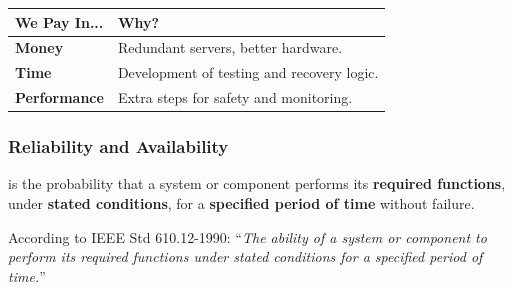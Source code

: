 \begin{table}[!htp]
    \centering
    \begin{tabular}{@{} l l @{}}
        \toprule
        We Pay In... & Why? \\
        \midrule
        \textbf{Money}          & Redundant servers, better hardware. \\ [.3em]
        \textbf{Time}           & Development of testing and recovery logic. \\ [.3em]
        \textbf{Performance}    & Extra steps for safety and monitoring. \\
        \bottomrule
    \end{tabular}
\end{table}

\newpage

\subsubsection{Reliability and Availability}

\highspace
\begin{definitionbox}[: Reliability]
     is the probability that a system or component performs its \textbf{required functions}, under \textbf{stated conditions}, for a \textbf{specified period of time} without failure.

    \highspace
    According to IEEE Std 610.12-1990: ``\emph{The ability of a system or component to perform its required functions under stated conditions for a specified period of time.}''
\end{definitionbox}

